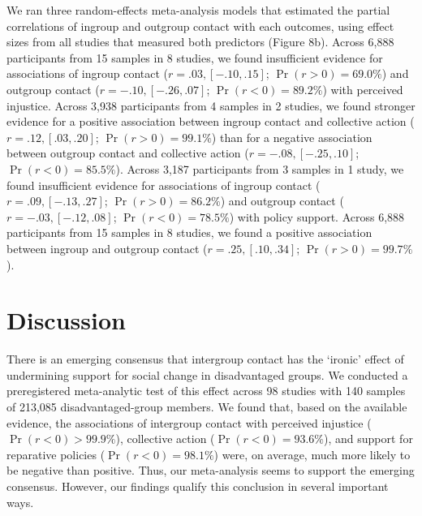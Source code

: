 \documentclass[12pt, letterpaper]{article}
\begin{document}
We ran three random-effects meta-analysis models that estimated the
partial correlations of ingroup and outgroup contact with each outcomes,
using effect sizes from all studies that measured both predictors
(Figure 8b). Across 6,888 participants from 15 samples in 8 studies, we
found insufficient evidence for associations of ingroup contact
(\(r = .03, [-.10, .15]\); \(\Pr (r > 0) = 69.0\%\)) and outgroup
contact (\(r = -.10, [-.26, .07]\); \(\Pr (r < 0) = 89.2\%\)) with
perceived injustice. Across 3,938 participants from 4 samples in 2
studies, we found stronger evidence for a positive association between
ingroup contact and collective action (\(r = .12, [.03, .20]\);
\(\Pr (r > 0) = 99.1\%\)) than for a negative association between
outgroup contact and collective action (\(r = -.08, [-.25, .10]\);
\(\Pr (r < 0) = 85.5\%\)). Across 3,187 participants from 3 samples in 1
study, we found insufficient evidence for associations of ingroup
contact (\(r = .09, [-.13, .27]\); \(\Pr (r > 0) = 86.2\%\)) and
outgroup contact (\(r = -.03, [-.12, .08]\); \(\Pr (r < 0) = 78.5\%\))
with policy support. Across 6,888 participants from 15 samples in 8
studies, we found a positive association between ingroup and outgroup
contact (\(r = .25, [.10, .34]\); \(\Pr (r > 0) = 99.7\%\)).

\hypertarget{discussion}{%
\section{Discussion}\label{discussion}}

There is an emerging consensus that intergroup contact has the `ironic'
effect of undermining support for social change in disadvantaged groups.
We conducted a preregistered meta-analytic test of this effect across 98
studies with 140 samples of 213,085 disadvantaged-group members. We
found that, based on the available evidence, the associations of
intergroup contact with perceived injustice (\(\Pr (r < 0) > 99.9\%\)),
collective action (\(\Pr (r < 0) = 93.6\%\)), and support for reparative
policies (\(\Pr (r < 0) = 98.1\%\)) were, on average, much more likely
to be negative than positive. Thus, our meta-analysis seems to support
the emerging consensus. However, our findings qualify this conclusion in
several important ways.
\end{document}

